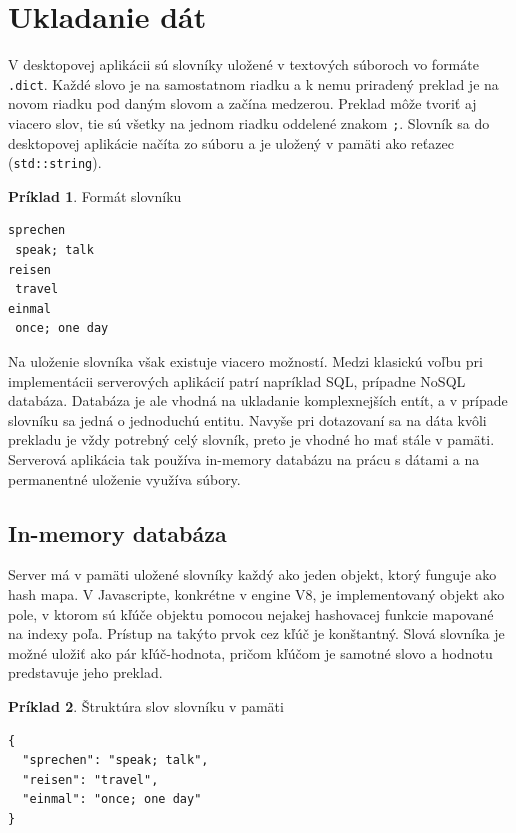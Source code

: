 \documentclass[
  digital, %
  table,   %
  lof,     %
  lot,     %
]{fithesis3}
\begin{document}
\section{Ukladanie dát}
V desktopovej aplikácii sú slovníky uložené v textových súboroch vo formáte \texttt{.dict}. Každé slovo je na samostatnom riadku a k nemu priradený preklad je na novom riadku pod daným slovom a začína medzerou. Preklad môže tvoriť aj viacero slov, tie sú všetky na jednom riadku oddelené znakom \texttt{;}. Slovník sa do desktopovej aplikácie načíta zo súboru a je uložený v pamäti ako reťazec (\texttt{std::string}).

\theoremstyle{definition}
\newtheorem{exmp}{Príklad}[chapter]
\begin{exmp}
Formát slovníku
\centering
\begin{lstlisting}[basicstyle=\small]
sprechen
 speak; talk
reisen
 travel
einmal
 once; one day
\end{lstlisting}
\end{exmp}

Na uloženie slovníka však existuje viacero možností. Medzi klasickú voľbu pri implementácii serverových aplikácií patrí napríklad SQL, prípadne NoSQL databáza. Databáza je ale vhodná na ukladanie komplexnejších entít, a v prípade slovníku sa jedná o jednoduchú entitu. Navyše pri dotazovaní sa na dáta kvôli prekladu je vždy potrebný celý slovník, preto je vhodné ho mať stále v pamäti. Serverová aplikácia tak používa in-memory databázu na prácu s dátami a na permanentné uloženie využíva súbory.

\subsection{In-memory databáza} \label{sec:inmemorydb}
Server má v pamäti uložené slovníky každý ako jeden objekt, ktorý funguje ako hash mapa. V Javascripte, konkrétne v engine V8, je implementovaný objekt ako pole, v ktorom sú kľúče objektu pomocou nejakej hashovacej funkcie mapované na indexy poľa. Prístup na takýto prvok cez kľúč je konštantný. Slová slovníka je možné uložiť ako pár kľúč-hodnota, pričom kľúčom je samotné slovo a hodnotu predstavuje jeho preklad.

\begin{exmp}
Štruktúra slov slovníku v pamäti
\centering
\begin{lstlisting}[basicstyle=\small]
{
  "sprechen": "speak; talk",
  "reisen": "travel",
  "einmal": "once; one day"
}
\end{lstlisting}
\end{exmp}
\end{document}
